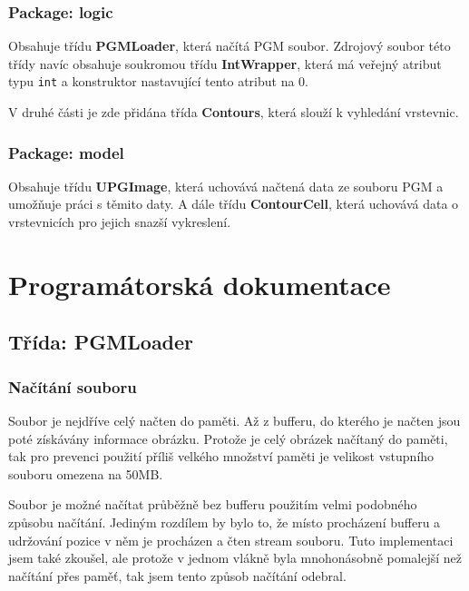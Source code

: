 \documentclass[12pt]{report}
\begin{document}
\subsubsection{Package: logic}
Obsahuje třídu \textbf{PGMLoader}, která načítá PGM soubor. Zdrojový soubor této třídy navíc obsahuje
soukromou třídu \textbf{IntWrapper}, která má veřejný atribut typu \texttt{int} a konstruktor nastavující
tento atribut na 0.

V druhé části je zde přidána třída \textbf{Contours}, která slouží k vyhledání vrstevnic.
\subsubsection{Package: model}
Obsahuje třídu \textbf{UPGImage}, která uchovává načtená data ze souboru PGM a umožňuje práci s těmito
daty. A dále třídu \textbf{ContourCell}, která uchovává data o vrstevnicích pro jejich snazší vykreslení.
%
\section{Programátorská dokumentace}
\subsection{Třída: PGMLoader}
%
\subsubsection{Načítání souboru}
Soubor je nejdříve celý načten do paměti. Až z bufferu, do kterého je načten jsou poté získávány informace
obrázku. Protože je celý obrázek načítaný do paměti, tak pro prevenci použití příliš velkého množství paměti
je velikost vstupního souboru omezena na 50MB.

Soubor je možné načítat průběžně bez bufferu použitím velmi podobného způsobu načítání. Jediným rozdílem
by bylo to, že místo procházení bufferu a udržování pozice v něm je procházen a čten stream souboru. Tuto
implementaci jsem také zkoušel, ale protože v jednom vlákně byla mnohonásobně pomalejší než načítání přes
paměť, tak jsem tento způsob načítání odebral.\\

\end{document}
